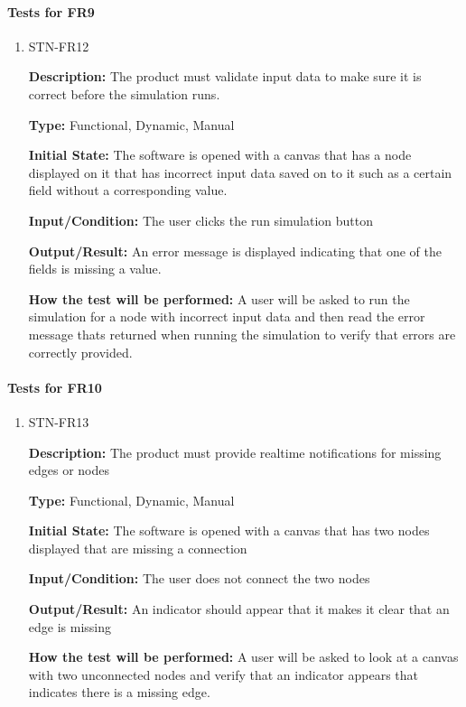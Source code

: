 \documentclass[12pt, titlepage]{article}
\begin{document}
\paragraph{Tests for FR9}

\begin{enumerate}

\item{STN-FR12\\}

\textbf{Description:} The product must validate input data to make sure it is correct before the simulation runs.

\textbf{Type:} Functional, Dynamic, Manual

\textbf{Initial State:} The software is opened with a canvas that has a node displayed on it that has incorrect input data saved on to it such as a certain field without a corresponding value.

\textbf{Input/Condition:} The user clicks the run simulation button

\textbf{Output/Result:} An error message is displayed indicating that one of the fields is missing a value.

\textbf{How the test will be performed:} A user will be asked to run the simulation for a node with incorrect input data and then read the error message thats returned when running the simulation to verify that errors are correctly provided.

\end{enumerate}


\paragraph{Tests for FR10}

\begin{enumerate}

\item{STN-FR13\\}

\textbf{Description:} The product must provide realtime notifications for missing edges or nodes

\textbf{Type:} Functional, Dynamic, Manual

\textbf{Initial State:} The software is opened with a canvas that has two nodes displayed that are missing a connection

\textbf{Input/Condition:} The user does not connect the two nodes

\textbf{Output/Result:} An indicator should appear that it makes it clear that an edge is missing

\textbf{How the test will be performed:} A user will be asked to look at a canvas with two unconnected nodes and verify that an indicator appears that indicates there is a missing edge.

\end{enumerate}
\end{document}
